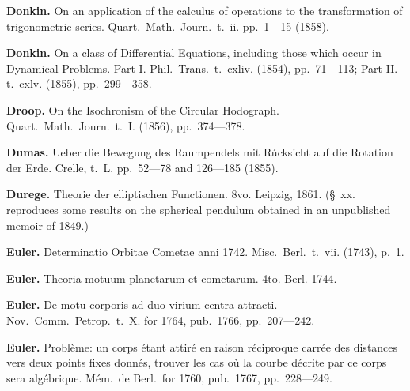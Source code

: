 \documentclass[12pt,a4paper]{article}
\theoremstyle{definition}
\begin{document}
\vspace{0.5em}

\noindent\textbf{Donkin.} On an application of the calculus of operations to the transformation of trigonometric series. Quart.~Math.~Journ.~t.~ii. pp.~1---15 (1858).

\vspace{0.5em}

\noindent\textbf{Donkin.} On a class of Differential Equations, including those which occur in Dynamical Problems. Part I. Phil.~Trans.~t.~cxliv. (1854), pp.~71---113; Part II. t.~cxlv. (1855), pp.~299---358.

\vspace{0.5em}

\noindent\textbf{Droop.} On the Isochronism of the Circular Hodograph. Quart.~Math.~Journ.~t.~I. (1856), pp.~374---378.

\vspace{0.5em}

\noindent\textbf{Dumas.} Ueber die Bewegung des Raumpendels mit R\'{u}cksicht auf die Rotation der Erde. Crelle, t.~L. pp.~52---78 and 126---185 (1855).

\vspace{0.5em}

\noindent\textbf{Durege.} Theorie der elliptischen Functionen. 8vo. Leipzig, 1861. (\S~xx. reproduces some results on the spherical pendulum obtained in an unpublished memoir of 1849.)

\vspace{0.5em}

\noindent\textbf{Euler.} Determinatio Orbitae Cometae anni 1742. Misc.~Berl.~t.~vii. (1743), p.~1.

\vspace{0.5em}

\noindent\textbf{Euler.} Theoria motuum planetarum et cometarum. 4to. Berl. 1744.

\vspace{0.5em}

\noindent\textbf{Euler.} De motu corporis ad duo virium centra attracti. Nov.~Comm.~Petrop.~t.~X. for 1764, pub.~1766, pp.~207---242.

\vspace{0.5em}

\noindent\textbf{Euler.} Probl\`{e}me: un corps \'{e}tant attir\'{e} en raison r\'{e}ciproque carr\'{e}e des distances vers deux points fixes donn\'{e}s, trouver les cas o\`{u} la courbe d\'{e}crite par ce corps sera alg\'{e}brique. M\'{e}m.~de Berl.~for 1760, pub.~1767, pp.~228---249.
\end{document}
